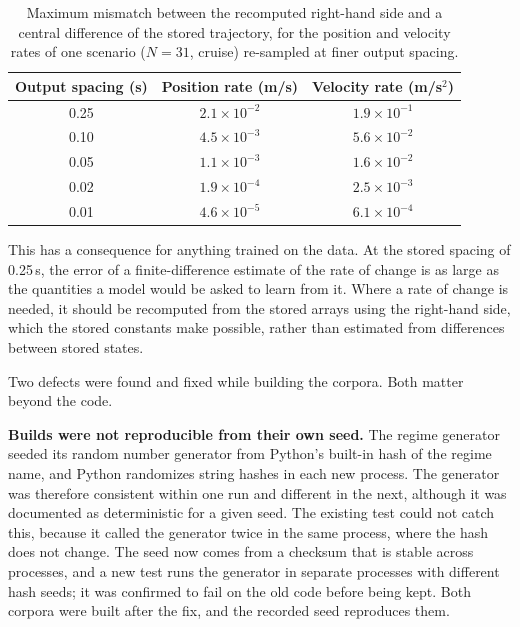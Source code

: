 \begin{table}[htbp]
    \centering
    \begin{tabular}{ccc}
        \toprule
        Output spacing (s) & Position rate (m/s) & Velocity rate (m/s$^2$) \\
        \midrule
        0.25 & $2.1\times10^{-2}$ & $1.9\times10^{-1}$ \\
        0.10 & $4.5\times10^{-3}$ & $5.6\times10^{-2}$ \\
        0.05 & $1.1\times10^{-3}$ & $1.6\times10^{-2}$ \\
        0.02 & $1.9\times10^{-4}$ & $2.5\times10^{-3}$ \\
        0.01 & $4.6\times10^{-5}$ & $6.1\times10^{-4}$ \\
        \bottomrule
    \end{tabular}
    \caption{Maximum mismatch between the recomputed right-hand side and a central difference of the stored trajectory, for the position and velocity rates of one scenario ($N = 31$, cruise) re-sampled at finer output spacing.}
    \label{tab:dataset_fd_convergence}
\end{table}

This has a consequence for anything trained on the data. At the stored spacing of 0.25\,s, the error of a finite-difference estimate of the rate of change is as large as the quantities a model would be asked to learn from it. Where a rate of change is needed, it should be recomputed from the stored arrays using the right-hand side, which the stored constants make possible, rather than estimated from differences between stored states.

Two defects were found and fixed while building the corpora. Both matter beyond the code.

\textbf{Builds were not reproducible from their own seed.} The regime generator seeded its random number generator from Python's built-in hash of the regime name, and Python randomizes string hashes in each new process. The generator was therefore consistent within one run and different in the next, although it was documented as deterministic for a given seed. The existing test could not catch this, because it called the generator twice in the same process, where the hash does not change. The seed now comes from a checksum that is stable across processes, and a new test runs the generator in separate processes with different hash seeds; it was confirmed to fail on the old code before being kept. Both corpora were built after the fix, and the recorded seed reproduces them.

